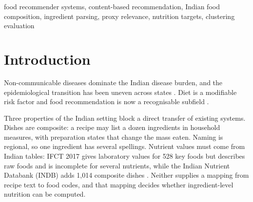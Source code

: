 \documentclass[conference]{IEEEtran}
\begin{document}
\begin{abstract}
Dietary tools built for Western food environments transfer poorly to Indian diets,
where dishes combine a dozen ingredients, ingredient names vary by region, and
composition data are incomplete. We report a content-based meal-recommendation pipeline
that couples ingredient-level features with cuisine, course and diet metadata, applies
dietary constraints as hard filters, and derives energy targets from anthropometric
input. The corpus holds 6{,}865 recipes, 90{,}862 parsed ingredient rows and 13{,}049
ingredient names; the composition layer uses IFCT 2017 (528 foods, nine nutrient fields)
and the Indian Nutrient Databank (1{,}014 dishes). With no interaction data, four methods
are compared on 50 held-out queries under a proxy relevance function. The deployed ranker
reaches Precision@5 of 0.996, Recall@5 of 0.0157, Diversity@10 of 0.869, Coverage@20 of
0.234 and 180\,ms per query, yet no method meets the project's recall or coverage
requirement, and clustering is poorly separated (best silhouette 0.047). Code analysis
shows the proxy threshold is exceeded by cuisine, course and diet agreement alone, so
near-ceiling precision measures metadata agreement rather than dietary usefulness. No
ingredient-to-IFCT mapping is approved and only 1.43\,\% of rows carry a resolved mass, so
the nutrition engine abstains rather than estimating.
\end{abstract}

\begin{IEEEkeywords} food recommender systems, content-based recommendation, Indian food composition, ingredient parsing, proxy relevance, nutrition targets, clustering evaluation \end{IEEEkeywords}

\section{Introduction} \label{sec:intro}

Non-communicable diseases dominate the Indian disease burden, and the epidemiological transition has been uneven across states \cite{isdb2017}. Diet is a modifiable risk factor and food recommendation is now a recognisable subfield \cite{trattner2017}.

Three properties of the Indian setting block a direct transfer of existing systems. Dishes are composite: a recipe may list a dozen ingredients in household measures, with preparation states that change the mass eaten. Naming is regional, so one ingredient has several spellings. Nutrient values must come from Indian tables: IFCT 2017 gives laboratory values for 528 key foods \cite{ifct2017} but describes raw foods and is incomplete for several nutrients, while the Indian Nutrient Databank (INDB) adds 1{,}014 composite dishes \cite{indb2024}. Neither supplies a mapping from recipe text to food codes, and that mapping decides whether ingredient-level nutrition can be computed.
\end{document}
